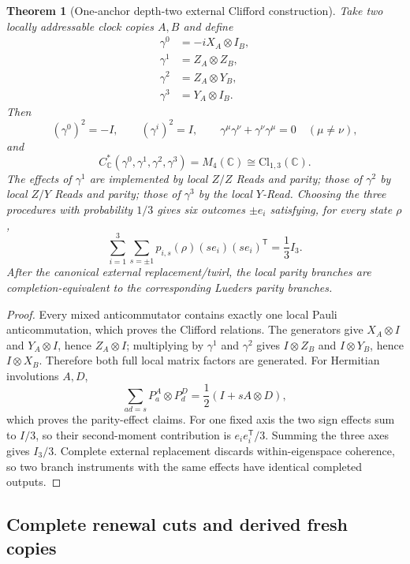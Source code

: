 \documentclass[11pt]{article}
\newtheorem{theorem}{Theorem}[section]
\theoremstyle{definition}
\theoremstyle{remark}
\newcommand{\C}{\mathbb C}
\newcommand{\Cl}{\mathrm{Cl}}
\begin{document}
\begin{theorem}[One-anchor depth-two external Clifford construction]
\label{thm:anchor-external-clifford-master}
Take two locally addressable clock copies $A,B$ and define
\[
 \boxed{
 \begin{aligned}
 \gamma^0&=-iX_A\otimes I_B,\\
 \gamma^1&=Z_A\otimes Z_B,\\
 \gamma^2&=Z_A\otimes Y_B,\\
 \gamma^3&=Y_A\otimes I_B.
 \end{aligned}}
\]
Then
\[
 (\gamma^0)^2=-I,
 \qquad
 (\gamma^i)^2=I,
 \qquad
 \gamma^\mu\gamma^\nu+\gamma^\nu\gamma^\mu=0
 \quad(\mu\ne\nu),
\]
and
\[
 \boxed{C^*_{\C}(\gamma^0,\gamma^1,\gamma^2,\gamma^3)
 =M_4(\C)\cong\Cl_{1,3}(\C).}
\]
The effects of $\gamma^1$ are implemented by local $Z/Z$ Reads and parity;
those of $\gamma^2$ by local $Z/Y$ Reads and parity; those of $\gamma^3$ by
the local $Y$-Read.  Choosing the three procedures with probability $1/3$
gives six outcomes $\pm e_i$ satisfying, for every state $\rho$,
\[
 \boxed{
 \sum_{i=1}^3\sum_{s=\pm1}
 p_{i,s}(\rho)(se_i)(se_i)^{\mathsf T}=\frac13I_3.}
\]
After the canonical external replacement/twirl, the local parity branches are
completion-equivalent to the corresponding Lueders parity branches.
\end{theorem}

\begin{proof}
Every mixed anticommutator contains exactly one local Pauli anticommutation,
which proves the Clifford relations.  The generators give
$X_A\otimes I$ and $Y_A\otimes I$, hence $Z_A\otimes I$; multiplying by
$\gamma^1$ and $\gamma^2$ gives $I\otimes Z_B$ and $I\otimes Y_B$, hence
$I\otimes X_B$.  Therefore both full local matrix factors are generated.
For Hermitian involutions $A,D$,
\[
 \sum_{ad=s}P^A_a\otimes P^D_d=\frac12(I+sA\otimes D),
\]
which proves the parity-effect claims.  For one fixed axis the two sign effects
sum to $I/3$, so their second-moment contribution is
$e_ie_i^{\mathsf T}/3$.  Summing the three axes gives $I_3/3$.  Complete
external replacement discards within-eigenspace coherence, so two branch
instruments with the same effects have identical completed outputs.
\end{proof}

\subsection{Complete renewal cuts and derived fresh copies}
\end{document}
